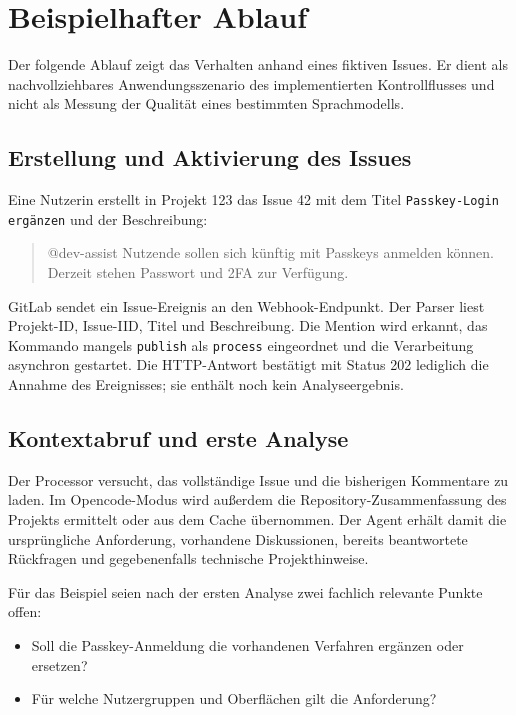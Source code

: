 \section{Beispielhafter Ablauf}

Der folgende Ablauf zeigt das Verhalten anhand eines fiktiven Issues. Er dient als nachvollziehbares Anwendungsszenario des implementierten Kontrollflusses und nicht als Messung der Qualität eines bestimmten Sprachmodells.

\subsection{Erstellung und Aktivierung des Issues}

Eine Nutzerin erstellt in Projekt 123 das Issue 42 mit dem Titel \texttt{Passkey-Login ergänzen} und der Beschreibung:

\begin{quote}
\ttfamily\raggedright
@dev-assist Nutzende sollen sich künftig mit Passkeys anmelden können. Derzeit stehen Passwort und 2FA zur Verfügung.
\end{quote}

GitLab sendet ein Issue-Ereignis an den Webhook-Endpunkt. Der Parser liest Projekt-ID, Issue-IID, Titel und Beschreibung. Die Mention wird erkannt, das Kommando mangels \texttt{publish} als \texttt{process} eingeordnet und die Verarbeitung asynchron gestartet. Die HTTP-Antwort bestätigt mit Status 202 lediglich die Annahme des Ereignisses; sie enthält noch kein Analyseergebnis.

\subsection{Kontextabruf und erste Analyse}

Der Processor versucht, das vollständige Issue und die bisherigen Kommentare zu laden. Im Opencode-Modus wird außerdem die Repository-Zusammenfassung des Projekts ermittelt oder aus dem Cache übernommen. Der Agent erhält damit die ursprüngliche Anforderung, vorhandene Diskussionen, bereits beantwortete Rückfragen und gegebenenfalls technische Projekthinweise.

Für das Beispiel seien nach der ersten Analyse zwei fachlich relevante Punkte offen:

\begin{itemize}[leftmargin=0.8cm]
\item Soll die Passkey-Anmeldung die vorhandenen Verfahren ergänzen oder ersetzen?
\item Für welche Nutzergruppen und Oberflächen gilt die Anforderung?
\end{itemize}

